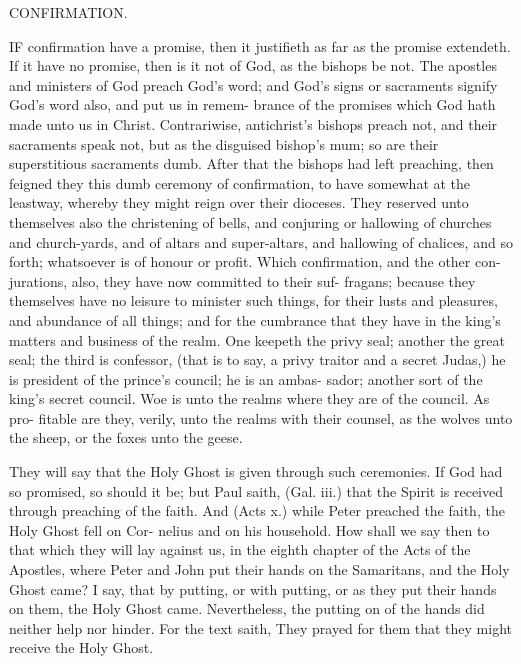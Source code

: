 \documentclass{custom}
\begin{document}
CONFIRMATION. 

IF confirmation have a promise, then it justifieth as far 
as the promise extendeth. If it have no promise, then 
is it not of God, as the bishops be not. The apostles and 
ministers of God preach God's word; and God's signs or 
sacraments signify God's word also, and put us in remem- 
brance of the promises which God hath made unto us in 
Christ. Contrariwise, antichrist's bishops preach not, 
and their sacraments speak not, but as the disguised 
bishop's mum; so are their superstitious sacraments 
dumb. After that the bishops had left preaching, then 
feigned they this dumb ceremony of confirmation, to have 
somewhat at the leastway, whereby they might reign over 
their dioceses. They reserved unto themselves also the 
christening of bells, and conjuring or hallowing of 
churches and church-yards, and of altars and super-altars, 
and hallowing of chalices, and so forth; whatsoever is of 
honour or profit. Which confirmation, and the other con- 
jurations, also, they have now committed to their suf- 
fragans; because they themselves have no leisure to 
minister such things, for their lusts and pleasures, and 
abundance of all things; and for the cumbrance that they 
have in the king's matters and business of the realm. One 
keepeth the privy seal; another the great seal; the third is 
confessor, (that is to say, a privy traitor and a secret Judas,) 
he is president of the prince's council; he is an ambas- 
sador; another sort of the king's secret council. Woe 
is unto the realms where they are of the council. As pro- 
fitable are they, verily, unto the realms with their counsel, 
as the wolves unto the sheep, or the foxes unto the geese. 

They will say that the Holy Ghost is given through 
such ceremonies. If God had so promised, so should it 
be; but Paul saith, (Gal. iii.) that the Spirit is received 
through preaching of the faith. And (Acts x.) while 
Peter preached the faith, the Holy Ghost fell on Cor- 
nelius and on his household. How shall we say then to that 
which they will lay against us, in the eighth chapter of 
the Acts of the Apostles, where Peter and John put their 
hands on the Samaritans, and the Holy Ghost came? I 
say, that by putting, or with putting, or as they put their 
hands on them, the Holy Ghost came. Nevertheless, the 
putting on of the hands did neither help nor hinder. For 
the text saith, They prayed for them that they might receive 
the Holy Ghost. 
\end{document}
